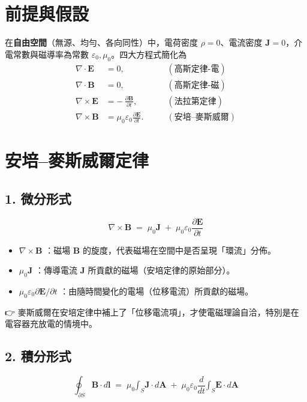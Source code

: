 \documentclass{article}
\def\dfrac#1#2{#1/#2}%
\def\int{\text{∫}}%
\begin{document}
\section*{前提與假設}
在\textbf{自由空間}（無源、均勻、各向同性）中，電荷密度 $\rho=0$、電流密度 $\bm J=0$，介電常數與磁導率為常數 $\varepsilon_0,\mu_0$。四大方程式簡化為
\begin{align}
\nabla \cdot \bm E &= 0, \qquad &(\text{高斯定律-電}) \label{eq:gaussE}\\
\nabla \cdot \bm B &= 0, \qquad &(\text{高斯定律-磁}) \label{eq:gaussB}\\
\nabla \times \bm E &= -\,\frac{\partial \bm B}{\partial t}, \qquad &(\text{法拉第定律}) \label{eq:faraday}\\
\nabla \times \bm B &= \mu_0 \varepsilon_0 \frac{\partial \bm E}{\partial t}. \qquad &(\text{安培--麥斯威爾}) \label{eq:ampere}
\end{align}


\section*{安培--麥斯威爾定律}

\subsection*{1. 微分形式}
\begin{equation}
\nabla \times \bm{B} \;=\; \mu_0 \bm{J} \;+\; \mu_0 \varepsilon_0 \frac{\partial \bm{E}}{\partial t}
\end{equation}

\begin{itemize}
  \item $\nabla \times \bm{B}$ ：磁場 $\bm{B}$ 的旋度，代表磁場在空間中是否呈現「環流」分佈。
  \item $\mu_0 \bm{J}$ ：傳導電流 $\bm{J}$ 所貢獻的磁場（安培定律的原始部分）。
  \item $\mu_0 \varepsilon_0 \dfrac{\partial \bm{E}}{\partial t}$ ：由隨時間變化的電場（位移電流）所貢獻的磁場。
\end{itemize}

\noindent
👉 麥斯威爾在安培定律中補上了「位移電流項」，才使電磁理論自洽，特別是在電容器充放電的情境中。

\subsection*{2. 積分形式}
\begin{equation}
\oint_{\partial S} \bm{B} \cdot d\bm{l}
\;=\;
\mu_0 \int_S \bm{J} \cdot d\bm{A}
\;+\;
\mu_0 \varepsilon_0 \frac{d}{dt} \int_S \bm{E} \cdot d\bm{A}
\end{equation}
\end{document}
